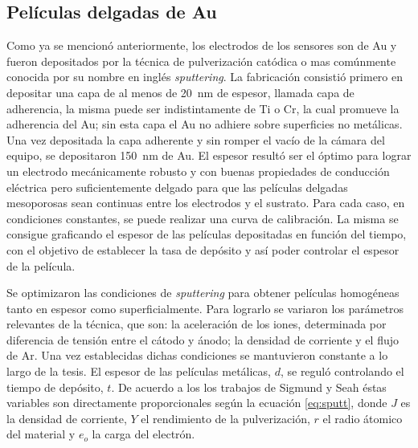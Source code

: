 { 		\subsection{Películas delgadas de Au}

		 Como ya se mencionó anteriormente, los electrodos de los sensores son de Au y fueron depositados por la técnica de pulverización catódica o mas comúnmente conocida por su nombre en inglés \textit{sputtering}. La fabricación consistió primero en depositar una capa de al menos de \SI{20}{\nm} de espesor, llamada capa de  adherencia, la misma puede ser indistintamente de Ti o Cr, la cual promueve la adherencia del Au; sin esta capa el Au no adhiere sobre superficies no metálicas.\cite{Hieber1976} Una vez depositada la capa adherente y sin romper el vacío de la cámara del equipo, se depositaron \SI{150}{nm} de Au. El espesor resultó ser el óptimo para lograr un electrodo mecánicamente robusto y con buenas propiedades de conducción eléctrica pero suficientemente delgado para que las películas delgadas mesoporosas sean continuas entre los electrodos y el sustrato. Para cada caso, en condiciones constantes, se puede realizar una curva de calibración. La misma se consigue graficando el espesor de las películas depositadas en función del tiempo, con el objetivo de establecer la tasa de depósito y así poder controlar el espesor de la película. 

		 Se optimizaron las condiciones de \textit{sputtering} para obtener películas homogéneas tanto en espesor como superficialmente. Para lograrlo se variaron los parámetros relevantes de la técnica, que son: la aceleración de los iones, determinada por diferencia de tensión entre el cátodo y ánodo; la densidad de corriente y el flujo de Ar. Una vez establecidas dichas condiciones se mantuvieron constante a lo largo de la tesis. El espesor de las películas metálicas, $d$, se reguló controlando el tiempo de depósito, $t$. De acuerdo a los los trabajos de Sigmund\cite{sigmund1968} y Seah\cite{Seah2005} éstas variables son directamente proporcionales según la ecuación \ref{eq:sputt}, donde $J$ es la densidad de corriente, $Y$ el rendimiento de la pulverización, $r$ el radio átomico del material y $e_o$ la carga del electrón.

}

